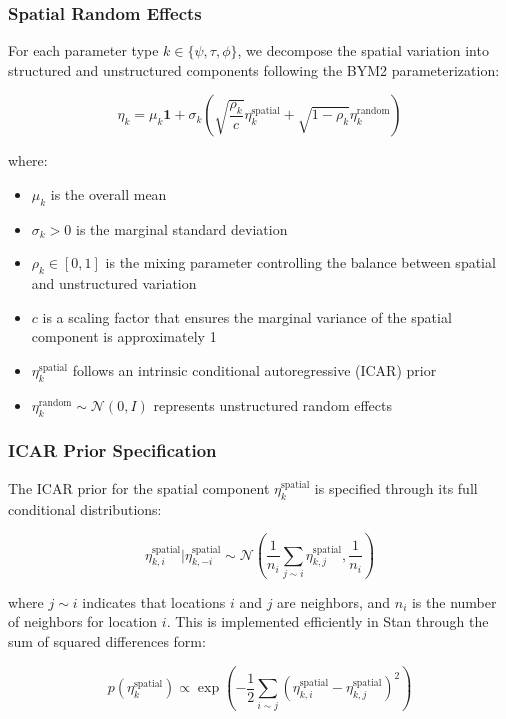 \documentclass[
  letterpaper,
  DIV=11,
  numbers=noendperiod]{scrartcl}
\providecommand{\tightlist}{%
  \setlength{\itemsep}{0pt}\setlength{\parskip}{0pt}}\usepackage{longtable,booktabs,array}
\begin{document}
\subsubsection{Spatial Random Effects}\label{spatial-random-effects}

For each parameter type \(k \in \{\psi, \tau, \phi\}\), we decompose the
spatial variation into structured and unstructured components following
the BYM2 parameterization:

\[\eta_k = \mu_k\mathbf{1} + \sigma_k\left(\sqrt{\frac{\rho_k}{c}}\eta^{\mathrm{spatial}}_k + \sqrt{1-\rho_k}\eta^{\mathrm{random}}_k\right)\]

where:

\begin{itemize}
\tightlist
\item
  \(\mu_k\) is the overall mean
\item
  \(\sigma_k > 0\) is the marginal standard deviation
\item
  \(\rho_k \in [0,1]\) is the mixing parameter controlling the balance
  between spatial and unstructured variation
\item
  \(c\) is a scaling factor that ensures the marginal variance of the
  spatial component is approximately 1
\item
  \(\eta^{\mathrm{spatial}}_k\) follows an intrinsic conditional
  autoregressive (ICAR) prior
\item
  \(\eta^{\mathrm{random}}_k \sim \mathcal{N}(0, I)\) represents
  unstructured random effects
\end{itemize}

\subsubsection{ICAR Prior Specification}\label{icar-prior-specification}

The ICAR prior for the spatial component \(\eta^{\mathrm{spatial}}_k\)
is specified through its full conditional distributions:

\[\eta^{\mathrm{spatial}}_{k,i} | \eta^{\mathrm{spatial}}_{k,-i} \sim \mathcal{N}\left(\frac{1}{n_i}\sum_{j \sim i} \eta^{\mathrm{spatial}}_{k,j}, \frac{1}{n_i}\right)\]

where \(j \sim i\) indicates that locations \(i\) and \(j\) are
neighbors, and \(n_i\) is the number of neighbors for location \(i\).
This is implemented efficiently in Stan through the sum of squared
differences form:

\[p(\eta^{\mathrm{spatial}}_k) \propto \exp\left(-\frac{1}{2}\sum_{i \sim j} (\eta^{\mathrm{spatial}}_{k,i} - \eta^{\mathrm{spatial}}_{k,j})^2\right)\]
\end{document}
